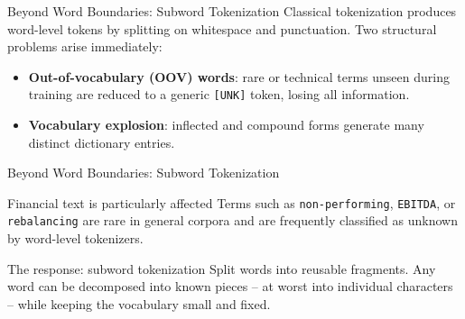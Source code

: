 \documentclass[aspectratio=169]{beamer}
\begin{document}
%
%
\begin{frame}{Beyond Word Boundaries: Subword Tokenization}
Classical tokenization produces word-level tokens by splitting on whitespace and punctuation.
Two structural problems arise immediately:
\vspace{0.5cm}
\begin{itemize}
    \item \textbf{Out-of-vocabulary (OOV) words}: rare or technical terms unseen during training
    are reduced to a generic \texttt{[UNK]} token, losing all information.
\vspace{0.5cm}
    \item \textbf{Vocabulary explosion}: inflected and compound forms generate many distinct
    dictionary entries.
\end{itemize}
\end{frame} 
%
%
\begin{frame}{Beyond Word Boundaries: Subword Tokenization}
\vspace{0.15cm}
\begin{block}{Financial text is particularly affected}
Terms such as \texttt{non-performing}, \texttt{EBITDA}, or \texttt{rebalancing} are rare
in general corpora and are frequently classified as unknown by word-level tokenizers.
\end{block}
 
\vspace{0.15cm}
\begin{alertblock}{The response: subword tokenization}
Split words into reusable fragments. Any word can be decomposed into known pieces --
at worst into individual characters -- while keeping the vocabulary small and fixed.
\end{alertblock}
\end{frame}
%
%
\end{document}
